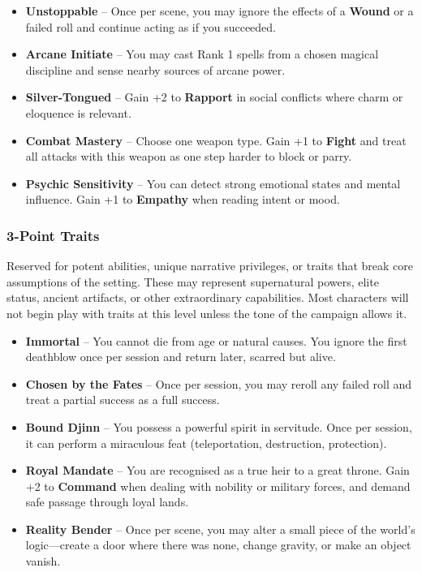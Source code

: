     \begin{itemize}
        \item \textbf{Unstoppable} – Once per scene, you may ignore the effects of a \textbf{Wound} or a failed roll and continue acting as if you succeeded.
        \item \textbf{Arcane Initiate} – You may cast Rank 1 spells from a chosen magical discipline and sense nearby sources of arcane power.
        \item \textbf{Silver-Tongued} – Gain +2 to \textbf{Rapport} in social conflicts where charm or eloquence is relevant.
        \item \textbf{Combat Mastery} – Choose one weapon type. Gain +1 to \textbf{Fight} and treat all attacks with this weapon as one step harder to block or parry.
        \item \textbf{Psychic Sensitivity} – You can detect strong emotional states and mental influence. Gain +1 to \textbf{Empathy} when reading intent or mood.
    \end{itemize}

\subsubsection{3-Point Traits}
Reserved for potent abilities, unique narrative privileges, or traits that break core assumptions of the setting. These may represent supernatural powers, elite status, ancient artifacts, or other extraordinary capabilities. Most characters will not begin play with traits at this level unless the tone of the campaign allows it.

    \begin{itemize}
        \item \textbf{Immortal} – You cannot die from age or natural causes. You ignore the first deathblow once per session and return later, scarred but alive.
        \item \textbf{Chosen by the Fates} – Once per session, you may reroll any failed roll and treat a partial success as a full success.
        \item \textbf{Bound Djinn} – You possess a powerful spirit in servitude. Once per session, it can perform a miraculous feat (teleportation, destruction, protection).
        \item \textbf{Royal Mandate} – You are recognised as a true heir to a great throne. Gain +2 to \textbf{Command} when dealing with nobility or military forces, and demand safe passage through loyal lands.
        \item \textbf{Reality Bender} – Once per scene, you may alter a small piece of the world’s logic—create a door where there was none, change gravity, or make an object vanish.
    \end{itemize}

